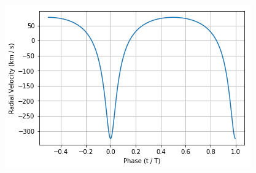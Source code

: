 \documentclass[11pt]{article}
\begin{document}
\includegraphics[width=.9\linewidth]{./obipy-resources/11275zTB.png}
\end{document}
